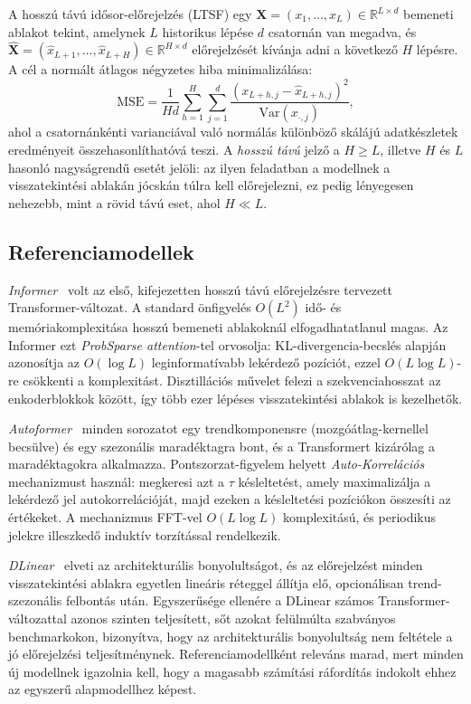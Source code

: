 A hosszú távú idősor-előrejelzés (LTSF) egy
$\mathbf{X} = (x_1, \ldots, x_L) \in \mathbb{R}^{L \times d}$
bemeneti ablakot tekint, amelynek $L$ historikus lépése $d$ csatornán van megadva,
és $\hat{\mathbf{X}} = (\hat{x}_{L+1}, \ldots, \hat{x}_{L+H}) \in \mathbb{R}^{H \times d}$
előrejelzését kívánja adni a következő $H$ lépésre.
A cél a normált átlagos négyzetes hiba minimalizálása:
\begin{equation}
    \mathrm{MSE} = \frac{1}{H d}
        \sum_{h=1}^{H} \sum_{j=1}^{d}
        \frac{(x_{L+h,j} - \hat{x}_{L+h,j})^2}{\mathrm{Var}(x_{\cdot,j})},
    \label{eq:mse}
\end{equation}
ahol a csatornánkénti varianciával való normálás különböző skálájú
adatkészletek eredményeit összehasonlíthatóvá teszi.
A \emph{hosszú távú} jelző a $H \geq L$, illetve $H$ és $L$ hasonló nagyságrendű esetét jelöli:
az ilyen feladatban a modellnek a visszatekintési ablakán jócskán túlra kell előrejelezni,
ez pedig lényegesen nehezebb, mint a rövid távú eset, ahol $H \ll L$.

\subsection{Referenciamodellek}

\emph{Informer}~\cite{zhou2021informer} volt az első, kifejezetten hosszú
távú előrejelzésre tervezett Transformer-változat. A standard önfigyelés
$O(L^2)$ idő- és memóriakomplexitása hosszú bemeneti ablakoknál
elfogadhatatlanul magas. Az Informer ezt \emph{ProbSparse attention}\textrm{-}tel
orvosolja: KL-divergencia-becslés alapján azonosítja az $O(\log L)$
leginformatívabb lekérdező pozíciót, ezzel $O(L \log L)$-re csökkenti
a komplexitást. Disztillációs művelet felezi a szekvenciahosszat az
enkoderblokkok között, így több ezer lépéses visszatekintési ablakok is
kezelhetők.

\emph{Autoformer}~\cite{wu2021autoformer} minden sorozatot egy
trendkomponensre (mozgóátlag-kernellel becsülve) és egy szezonális
maradéktagra bont, és a Transformert kizárólag a maradéktagokra alkalmazza.
Pontszorzat-figyelem helyett \emph{Auto-Korrelációs} mechanizmust
használ: megkeresi azt a $\tau$ késleltetést, amely maximalizálja
a lekérdező jel autokorrelációját, majd ezeken a késleltetési pozíciókon
összesíti az értékeket. A mechanizmus FFT-vel $O(L \log L)$ komplexitású,
és periodikus jelekre illeszkedő induktív torzítással rendelkezik.

\emph{DLinear}~\cite{zeng2023transformers} elveti az architekturális
bonyolultságot, és az előrejelzést minden visszatekintési ablakra
egyetlen lineáris réteggel állítja elő, opcionálisan trend-szezonális
felbontás után. Egyszerűsége ellenére a DLinear számos Transformer-változattal
azonos szinten teljesített, sőt azokat felülmúlta szabványos benchmarkokon,
bizonyítva, hogy az architekturális bonyolultság nem feltétele a jó
előrejelzési teljesítménynek. Referenciamodellként releváns marad, mert
minden új modellnek igazolnia kell, hogy a magasabb számítási ráfordítás
indokolt ehhez az egyszerű alapmodellhez képest.

